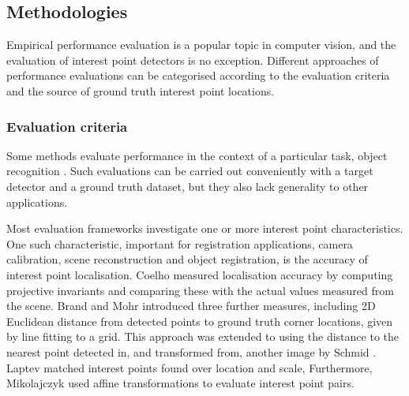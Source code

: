 \subsection{Methodologies}

Empirical performance evaluation is a popular topic in computer vision, and the evaluation of interest point detectors is no exception. Different approaches of performance evaluations can be categorised according to the evaluation criteria and the source of ground truth interest point locations. 

\subsubsection{Evaluation criteria}

Some methods evaluate performance in the context of a particular task, \eg object recognition \cite{Shin1999, Dutagaci2011}. Such evaluations can be carried out conveniently with a target detector and a ground truth dataset, but they also lack generality to other applications. 

Most evaluation frameworks investigate one or more interest point characteristics. 
One such characteristic, important for registration applications, \eg camera calibration, scene reconstruction and object registration, is the accuracy of interest point localisation. 
Coelho \etal \cite{Coelho1992} measured localisation accuracy by computing projective invariants and comparing these with the actual values measured from the scene. 
Brand and Mohr \cite{Brand1994} introduced three further measures, including 2D Euclidean distance from detected points to ground truth corner locations, given by line fitting to a grid. This approach was extended to using the distance to the nearest point detected in, and transformed from, another image by Schmid \etal \cite{Schmid2000}. 
Laptev \cite{Laptev2003} matched interest points found over location and scale, 
Furthermore, Mikolajczyk \etal \cite{Mikolajczyk2004} used affine transformations to evaluate interest point pairs. 

